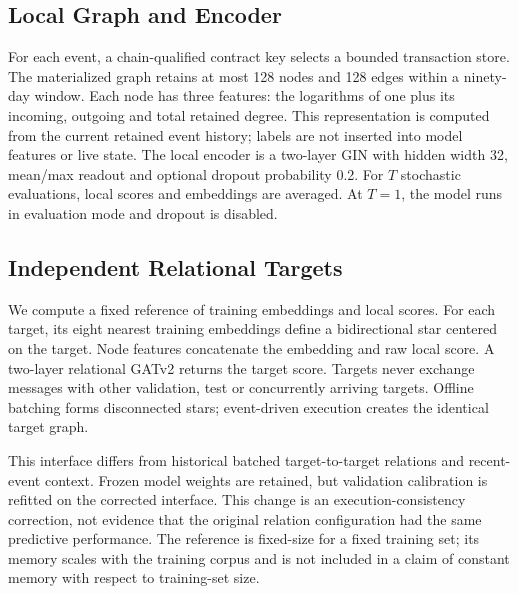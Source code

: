 \documentclass[10pt,journal]{IEEEtran}
\begin{document}
\subsection{Local Graph and Encoder}
For each event, a chain-qualified contract key selects a bounded transaction store. The materialized graph retains at most 128 nodes and 128 edges within a ninety-day window. Each node has three features: the logarithms of one plus its incoming, outgoing and total retained degree. This representation is computed from the current retained event history; labels are not inserted into model features or live state. The local encoder is a two-layer GIN with hidden width 32, mean/max readout and optional dropout probability 0.2. For $T$ stochastic evaluations, local scores and embeddings are averaged. At $T=1$, the model runs in evaluation mode and dropout is disabled.

\subsection{Independent Relational Targets}
We compute a fixed reference of training embeddings and local scores. For each target, its eight nearest training embeddings define a bidirectional star centered on the target. Node features concatenate the embedding and raw local score. A two-layer relational GATv2 returns the target score. Targets never exchange messages with other validation, test or concurrently arriving targets. Offline batching forms disconnected stars; event-driven execution creates the identical target graph.

This interface differs from historical batched target-to-target relations and recent-event context. Frozen model weights are retained, but validation calibration is refitted on the corrected interface. This change is an execution-consistency correction, not evidence that the original relation configuration had the same predictive performance. The reference is fixed-size for a fixed training set; its memory scales with the training corpus and is not included in a claim of constant memory with respect to training-set size.
\end{document}
